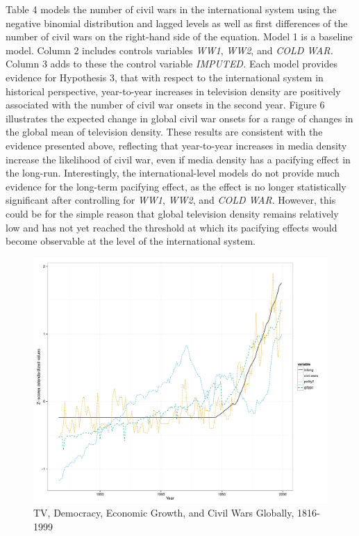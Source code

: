 \documentclass[11pt,article,oneside]{memoir}
\makeatletter
\def\maxwidth{\ifdim\Gin@nat@width>\linewidth\linewidth
\else\Gin@nat@width\fi}
\let\Oldincludegraphics\includegraphics
\renewcommand{\includegraphics}[1]{\Oldincludegraphics[width=\maxwidth]{#1}}
\makeatother
\begin{document}
Table 4 models the number of civil wars in the international system
using the negative binomial distribution and lagged levels as well as
first differences of the number of civil wars on the right-hand side of
the equation. Model 1 is a baseline model. Column 2 includes controls
variables \emph{WW1}, \emph{WW2}, and \emph{COLD WAR.} Column 3 adds to
these the control variable \emph{IMPUTED.} Each model provides evidence
for Hypothesis 3, that with respect to the international system in
historical perspective, year-to-year increases in television density are
positively associated with the number of civil war onsets in the second
year. Figure 6 illustrates the expected change in global civil war
onsets for a range of changes in the global mean of television density.
These results are consistent with the evidence presented above,
reflecting that year-to-year increases in media density increase the
likelihood of civil war, even if media density has a pacifying effect in
the long-run. Interestingly, the international-level models do not
provide much evidence for the long-term pacifying effect, as the effect
is no longer statistically significant after controlling for \emph{WW1},
\emph{WW2}, and \emph{COLD WAR}. However, this could be for the simple
reason that global television density remains relatively low and has not
yet reached the threshold at which its pacifying effects would become
observable at the level of the international system.

\begin{figure}[htbp]
\centering
\includegraphics{./media_civil_war_files/figure-markdown/longrunplot.pdf}
\caption{TV, Democracy, Economic Growth, and Civil Wars Globally,
1816-1999}
\end{figure}
\end{document}
